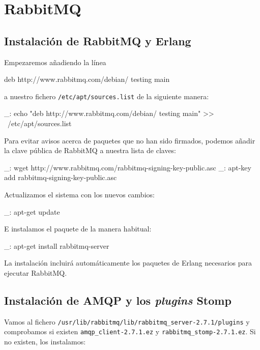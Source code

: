 \chapter{RabbitMQ}
\label{comun:rabbitmq}

\section{Instalación de RabbitMQ y Erlang}

Empezaremos añadiendo la línea

\begin{bashcode}
deb http://www.rabbitmq.com/debian/ testing main
\end{bashcode}

a nuestro fichero \texttt{/etc/apt/sources.list} de la siguiente manera:

\begin{bashcode}
_: echo "deb http://www.rabbitmq.com/debian/ testing main" >> \
/etc/apt/sources.list
\end{bashcode}

Para evitar avisos acerca de paquetes que no han sido firmados, podemos añadir la clave pública de RabbitMQ a nuestra lista de claves:

\begin{bashcode}
_: wget http://www.rabbitmq.com/rabbitmq-signing-key-public.asc
_: apt-key add rabbitmq-signing-key-public.asc
\end{bashcode}

Actualizamos el sistema con los nuevos cambios:

\begin{bashcode}
_: apt-get update
\end{bashcode}

E instalamos el paquete de la manera habitual:

\begin{bashcode}
_: apt-get install rabbitmq-server
\end{bashcode}

La instalación incluirá automáticamente los paquetes de Erlang necesarios para ejecutar RabbitMQ.


\section{Instalación de AMQP y los \emph{plugins} Stomp}

Vamos al fichero \texttt{/usr/lib/rabbitmq/lib/rabbitmq\_server-2.7.1/plugins} 
y comprobamos si existen \texttt{amqp\_client-2.7.1.ez} y \texttt{rabbitmq\_stomp-2.7.1.ez}. Si no existen, los instalamos:

